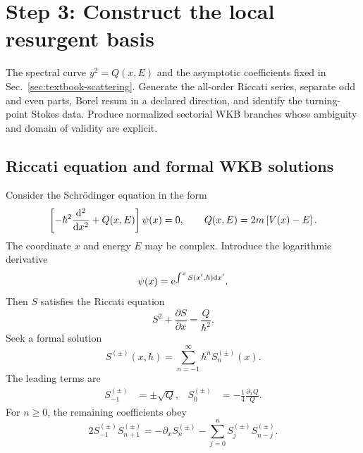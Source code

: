 \section{Step 3: Construct the local resurgent basis}
\label{sec:exact-wkb}

\calculationroute
  {The spectral curve $y^2=Q(x,E)$ and the asymptotic coefficients fixed in
  Sec.~\ref{sec:textbook-scattering}.}
  {Generate the all-order Riccati series, separate odd and even parts, Borel
  resum in a declared direction, and identify the turning-point Stokes data.}
  {Produce normalized sectorial WKB branches whose ambiguity and domain of
  validity are explicit.}

\subsection{Riccati equation and formal WKB solutions}
\label{subsec:wkb-riccati}

Consider the Schr\"odinger equation in the form
\begin{equation}
  \left[-\hbar^2\frac{\mathrm{d}^2}{\mathrm{d} x^2}+Q(x,E)\right]\psi(x)=0,
  \qquad
  Q(x,E)=2m\left[V(x)-E\right] .
  \label{eq:wkb-schrodinger}
\end{equation}
The coordinate $x$ and energy $E$ may be complex.  Introduce the logarithmic
derivative
\begin{equation}
  \psi(x)=\mathrm{e}^{\int^x S(x',\hbar)\mathrm{d} x'} .
  \label{eq:wkb-log-ansatz}
\end{equation}
Then $S$ satisfies the Riccati equation
\begin{equation}
  S^2+\frac{\partial S}{\partial x}
  =\frac{Q}{\hbar^2} .
  \label{eq:wkb-riccati}
\end{equation}
Seek a formal solution
\begin{equation}
  S^{(\pm)}(x,\hbar)
  =\sum_{n=-1}^{\infty}\hbar^nS_n^{(\pm)}(x) .
  \label{eq:wkb-S-series}
\end{equation}
The leading terms are
\begin{align}
  S_{-1}^{(\pm)}&=\pm\sqrt{Q},
  &S_0^{(\pm)}&=-\frac{1}{4}\frac{\partial_xQ}{Q} .
  \label{eq:wkb-leading}
\end{align}
For $n\ge0$, the remaining coefficients obey
\begin{equation}
  2S_{-1}^{(\pm)}S_{n+1}^{(\pm)}
  =-\partial_xS_n^{(\pm)}
  -\sum_{j=0}^{n}S_j^{(\pm)}S_{n-j}^{(\pm)} .
  \label{eq:wkb-recursion}
\end{equation}

